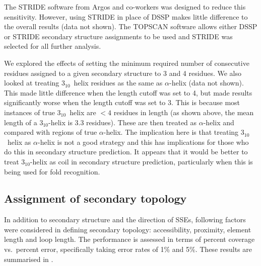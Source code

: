 \documentclass{article}
\newcommand{\htt}{\mbox{$3_{10}$}}
\begin{document}
The STRIDE software from Argos and co-workers\cite{frishman:ssassign} was
designed to reduce this sensitivity. However, using STRIDE in place of
DSSP makes little difference to the overall results (data not
shown). The TOPSCAN software allows either DSSP or STRIDE secondary
structure assignments to be used and STRIDE was selected for all
further analysis.


We explored the effects of setting the minimum required number of
consecutive residues assigned to a given secondary structure to 3 and
4 residues. We also looked at treating \htt\ helix residues as the
same as $\alpha$-helix (data not shown). This made little difference
when the length cutoff was set to 4, but made results significantly
worse when the length cutoff was set to 3. This is because most
instances of true \htt\ helix are $<4$ residues in length (as shown
above, the mean length of a \htt-helix is 3.3 residues). These are
then treated as $\alpha$-helix and compared with regions of true
$\alpha$-helix.  The implication here is that treating \htt\ helix as
$\alpha$-helix is not a good strategy and this has implications for
those who do this in secondary structure prediction\cite[for
example]{king:combine}. It appears that it would be better to treat
\htt-helix as coil in secondary structure prediction, particularly
when this is being used for fold recognition.


\subsection{Assignment of secondary topology}
In addition to secondary structure and the direction of SSEs, 
following factors were considered in defining secondary topology:
accessibility, proximity, element length and loop length. The
performance is assessed in terms of percent coverage vs.\ percent
error, specifically taking error rates of 1\% and 5\%. These results
are summarised in \tableref{\ref{tab:summary}}.
\end{document}
